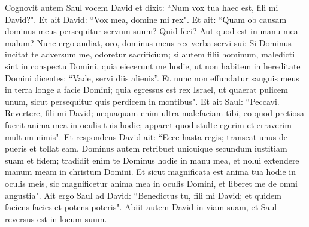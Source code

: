 \begin{biblechapter}
\verse Cognovit autem Saul vocem David et dixit: “Num vox tua haec est, fili mi David?". Et ait David: “Vox mea, domine mi rex". 
\verse Et ait: “Quam ob causam dominus meus persequitur servum suum? Quid feci? Aut quod est in manu mea malum? 
\verse Nunc ergo audiat, oro, dominus meus rex verba servi sui: Si Dominus incitat te adversum me, odoretur sacrificium; si autem filii hominum, maledicti sint in conspectu Domini, quia eiecerunt me hodie, ut non habitem in hereditate Domini dicentes: “Vade, servi diis alienis”. 
\verse Et nunc non effundatur sanguis meus in terra longe a facie Domini; quia egressus est rex Israel, ut quaerat pulicem unum, sicut persequitur quis perdicem in montibus". 
\verse Et ait Saul: “Peccavi. Revertere, fili mi David; nequaquam enim ultra malefaciam tibi, eo quod pretiosa fuerit anima mea in oculis tuis hodie; apparet quod stulte egerim et erraverim multum nimis". 
\verse Et respondens David ait: “Ecce hasta regis; transeat unus de pueris et tollat eam. 
\verse Dominus autem retribuet unicuique secundum iustitiam suam et fidem; tradidit enim te Dominus hodie in manu mea, et nolui extendere manum meam in christum Domini. 
\verse Et sicut magnificata est anima tua hodie in oculis meis, sic magnificetur anima mea in oculis Domini, et liberet me de omni angustia". 
\verse Ait ergo Saul ad David: “Benedictus tu, fili mi David; et quidem faciens facies et potens poteris". Abiit autem David in viam suam, et Saul reversus est in locum suum. 
\end{biblechapter}

